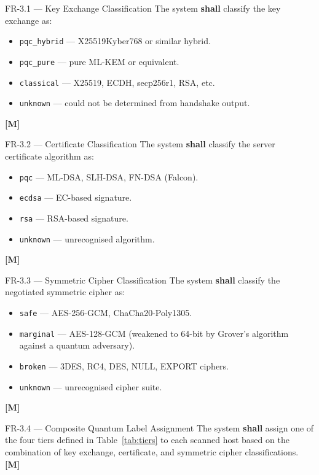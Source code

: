 \begin{reqbox}{FR-3.1 — Key Exchange Classification}
  The system \textbf{shall} classify the key exchange as:
  \begin{itemize}[noitemsep]
    \item \texttt{pqc\_hybrid} — X25519Kyber768 or similar hybrid.
    \item \texttt{pqc\_pure} — pure ML-KEM or equivalent.
    \item \texttt{classical} — X25519, ECDH, secp256r1, RSA, etc.
    \item \texttt{unknown} — could not be determined from handshake output.
  \end{itemize}
  \hfill \textbf{[M]}
\end{reqbox}

\begin{reqbox}{FR-3.2 — Certificate Classification}
  The system \textbf{shall} classify the server certificate algorithm as:
  \begin{itemize}[noitemsep]
    \item \texttt{pqc} — ML-DSA, SLH-DSA, FN-DSA (Falcon).
    \item \texttt{ecdsa} — EC-based signature.
    \item \texttt{rsa} — RSA-based signature.
    \item \texttt{unknown} — unrecognised algorithm.
  \end{itemize}
  \hfill \textbf{[M]}
\end{reqbox}

\begin{reqbox}{FR-3.3 — Symmetric Cipher Classification}
  The system \textbf{shall} classify the negotiated symmetric cipher as:
  \begin{itemize}[noitemsep]
    \item \texttt{safe} — AES-256-GCM, ChaCha20-Poly1305.
    \item \texttt{marginal} — AES-128-GCM (weakened to 64-bit by Grover's
          algorithm against a quantum adversary).
    \item \texttt{broken} — 3DES, RC4, DES, NULL, EXPORT ciphers.
    \item \texttt{unknown} — unrecognised cipher suite.
  \end{itemize}
  \hfill \textbf{[M]}
\end{reqbox}

\begin{reqbox}{FR-3.4 — Composite Quantum Label Assignment}
  The system \textbf{shall} assign one of the four tiers defined in
  Table~\ref{tab:tiers} to each scanned host based on the combination of
  key exchange, certificate, and symmetric cipher classifications. \hfill \textbf{[M]}
\end{reqbox}

